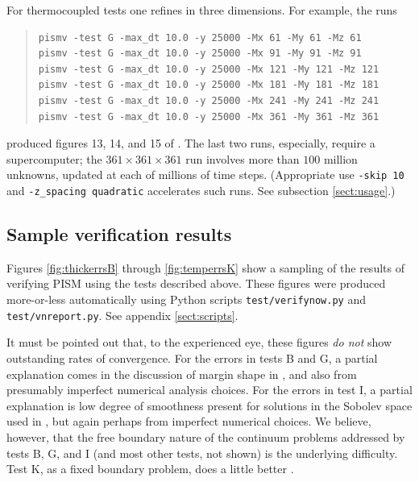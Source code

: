 \documentclass[11pt,final]{amsart}
\begin{document}
For thermocoupled tests one refines in three dimensions.  For example, the runs
\begin{quote}\small
\begin{verbatim}
pismv -test G -max_dt 10.0 -y 25000 -Mx 61 -My 61 -Mz 61
pismv -test G -max_dt 10.0 -y 25000 -Mx 91 -My 91 -Mz 91
pismv -test G -max_dt 10.0 -y 25000 -Mx 121 -My 121 -Mz 121
pismv -test G -max_dt 10.0 -y 25000 -Mx 181 -My 181 -Mz 181
pismv -test G -max_dt 10.0 -y 25000 -Mx 241 -My 241 -Mz 241
pismv -test G -max_dt 10.0 -y 25000 -Mx 361 -My 361 -Mz 361
\end{verbatim}
\normalsize\end{quote}
produced figures 13, 14, and 15 of \cite{BBL}.  The last two runs, especially, require a supercomputer; the $361\times 361\times 361$ run involves more than $100$ million unknowns, updated at each of millions of time steps.  (Appropriate use \verb|-skip 10| and \verb|-z_spacing quadratic| accelerates such runs.  See subsection \ref{sect:usage}.)

\subsection{Sample verification results}  Figures \ref{fig:thickerrsB} through \ref{fig:temperrsK} show a sampling of the results of verifying PISM using the tests described above.  These figures were produced more-or-less automatically using Python scripts \verb|test/verifynow.py| and \verb|test/vnreport.py|.  See appendix \ref{sect:scripts}.

It must be pointed out that, to the experienced eye, these figures \emph{do not} show outstanding rates of convergence.  For the errors in tests B and G, a partial explanation comes in the discussion of margin shape in \cite{BLKCB}, and also from presumably imperfect numerical analysis choices.  For the errors in test I, a partial explanation is low degree of smoothness present for solutions in the Sobolev space used in \cite{SchoofStream}, but again perhaps from imperfect numerical choices.  We believe, however, that the free boundary nature of the continuum problems addressed by tests B, G, and I (and most other tests, not shown) is the underlying difficulty.  Test K, as a fixed boundary problem, does a little better \cite{BuelerTestK}.
\end{document}
